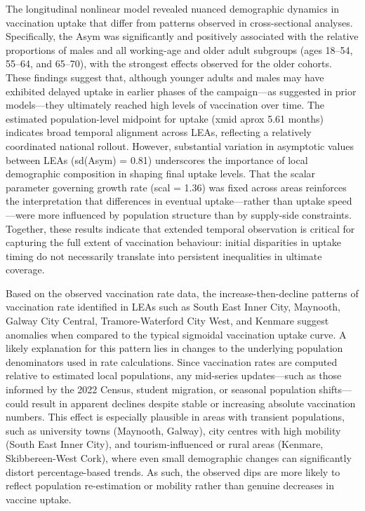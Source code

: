\documentclass{article}
\begin{document}
The longitudinal nonlinear model revealed nuanced demographic dynamics
in vaccination uptake that differ from patterns observed in
cross-sectional analyses. Specifically, the Asym was significantly and
positively associated with the relative proportions of males and all
working-age and older adult subgroups (ages 18--54, 55--64, and 65--70),
with the strongest effects observed for the older cohorts. These
findings suggest that, although younger adults and males may have
exhibited delayed uptake in earlier phases of the campaign---as
suggested in prior models---they ultimately reached high levels of
vaccination over time. The estimated population-level midpoint for
uptake (xmid aprox 5.61 months) indicates broad temporal alignment
across LEAs, reflecting a relatively coordinated national rollout.
However, substantial variation in asymptotic values between LEAs
(sd(Asym) = 0.81) underscores the importance of local demographic
composition in shaping final uptake levels. That the scalar parameter
governing growth rate (scal = 1.36) was fixed across areas reinforces
the interpretation that differences in eventual uptake---rather than
uptake speed---were more influenced by population structure than by
supply-side constraints. Together, these results indicate that extended
temporal observation is critical for capturing the full extent of
vaccination behaviour: initial disparities in uptake timing do not
necessarily translate into persistent inequalities in ultimate coverage.

Based on the observed vaccination rate data, the increase-then-decline
patterns of vaccination rate identified in LEAs such as South East Inner
City, Maynooth, Galway City Central, Tramore-Waterford City West, and
Kenmare suggest anomalies when compared to the typical sigmoidal
vaccination uptake curve. A likely explanation for this pattern lies in
changes to the underlying population denominators used in rate
calculations. Since vaccination rates are computed relative to estimated
local populations, any mid-series updates---such as those informed by
the 2022 Census, student migration, or seasonal population
shifts---could result in apparent declines despite stable or increasing
absolute vaccination numbers. This effect is especially plausible in
areas with transient populations, such as university towns (Maynooth,
Galway), city centres with high mobility (South East Inner City), and
tourism-influenced or rural areas (Kenmare, Skibbereen-West Cork), where
even small demographic changes can significantly distort
percentage-based trends. As such, the observed dips are more likely to
reflect population re-estimation or mobility rather than genuine
decreases in vaccine uptake.
\end{document}
